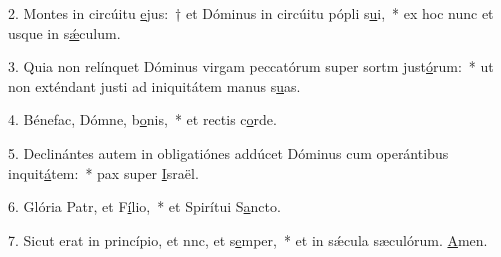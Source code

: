 2. Montes in circúitu \uline{e}jus:~† et Dóminus in circúitu pópli s\uline{u}i,~* ex hoc nunc et usque in s\uline{ǽ}culum.\par 
3. Quia non relínquet Dóminus virgam peccatórum super sortm just\uline{ó}rum:~* ut non exténdant justi ad iniquitátem manus s\uline{u}as.\par 
4. Bénefac, Dómne, b\uline{o}nis,~* et rectis c\uline{o}rde.\par 
5. Declinántes autem in obligatiónes addúcet Dóminus cum operántibus inquit\uline{á}tem:~* pax super \uline{I}sraël.\par 
6. Glória Patr, et F\uline{í}lio,~* et Spirítui S\uline{a}ncto.\par 
7. Sicut erat in princípio, et nnc, et s\uline{e}mper,~* et in sǽcula sæculórum. \uline{A}men.\par 
